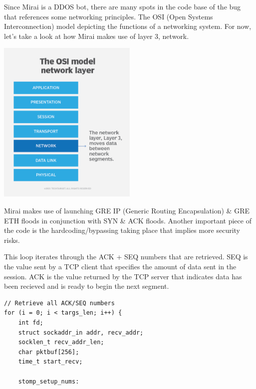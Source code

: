 \documentclass[12pt, letterpaper]{article}
\begin{document}
\begin{sloppypar}
\begin{flushleft}
\begin{lstlisting}
\end{lstlisting}

Since Mirai is a DDOS bot, there are many spots in the code base of the bug that 
references some networking principles. The OSI (Open Systems Interconnection) model 
depicting the functions of a networking system. For now, let's take a look at how
Mirai makes use of layer 3, network. 
\begin{center}
{\includegraphics[width=0.5\textwidth]{osi-networking.png}}
\end{center}

Mirai makes use of launching GRE IP (Generic Routing Encapsulation) \& GRE ETH floods
in conjunction with SYN \& ACK floods. Another important piece of the code is the 
hardcoding/bypassing taking place that implies more security risks. 


This loop iterates through the ACK + SEQ numbers that are retrieved. SEQ is the value
sent by a TCP client that specifies the amount of data sent in the session. ACK is the 
value returned by the TCP server that indicates data has been recieved and is ready to
begin the next segment. 

\begin{lstlisting}
// Retrieve all ACK/SEQ numbers
for (i = 0; i < targs_len; i++) {
    int fd;
    struct sockaddr_in addr, recv_addr;
    socklen_t recv_addr_len;
    char pktbuf[256];
    time_t start_recv;

    stomp_setup_nums:
\end{lstlisting}



\end{flushleft}
\end{sloppypar}
\end{document}
